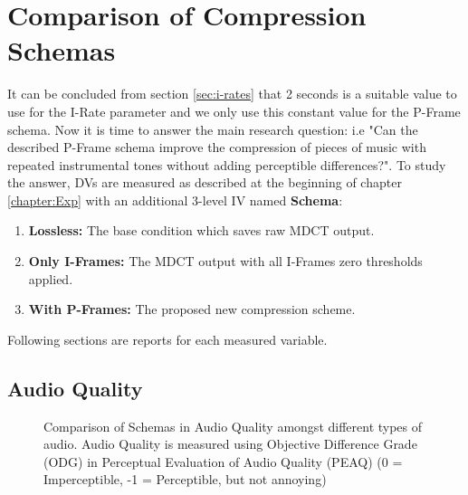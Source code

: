 \section{Comparison of Compression Schemas}
\label{sec:pframe-exp}

It can be concluded from section \ref{sec:i-rates} that 2 seconds is a suitable value to use for the I-Rate parameter and we only use this constant value for the P-Frame schema. Now it is time to answer the main research question: i.e "Can the described P-Frame schema improve the compression of pieces of music with repeated instrumental tones without adding perceptible differences?". To study the answer, DVs are measured as described at the beginning of chapter \ref{chapter:Exp} with an additional 3-level IV named \textbf{Schema}:

\begin{enumerate}
\item\textbf{Lossless:} The base condition which saves raw MDCT output.
\item\textbf{Only I-Frames:} The MDCT output with all I-Frames zero thresholds applied.
\item\textbf{With P-Frames:} The proposed new compression scheme.
\end{enumerate}

\noindent Following sections are reports for each measured variable.

\subsection{Audio Quality}

\begin{figure}[ht]
  
  \caption[Comparison of Schemas in Audio Quality amongst different types of audio]{Comparison of Schemas in Audio Quality amongst different types of audio. Audio Quality is measured using Objective Difference Grade (ODG) in Perceptual Evaluation of Audio Quality (PEAQ) (0 = Imperceptible, -1 = Perceptible, but not annoying)}
  \label{fig:input-peaq}
\end{figure}

